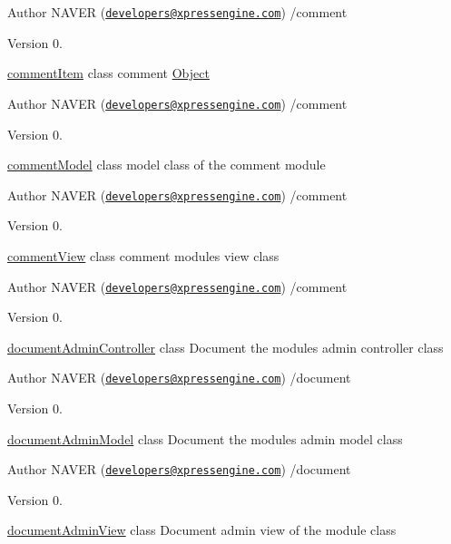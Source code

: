 \begin{DoxyAuthor}{Author}
N\+A\+V\+E\+R (\href{mailto:developers@xpressengine.com}{\tt developers@xpressengine.\+com}) /comment 
\end{DoxyAuthor}
\begin{DoxyVersion}{Version}
0.
\end{DoxyVersion}
\hyperlink{classcommentItem}{comment\+Item} class comment \hyperlink{classObject}{Object}

\begin{DoxyAuthor}{Author}
N\+A\+V\+E\+R (\href{mailto:developers@xpressengine.com}{\tt developers@xpressengine.\+com}) /comment 
\end{DoxyAuthor}
\begin{DoxyVersion}{Version}
0.
\end{DoxyVersion}
\hyperlink{classcommentModel}{comment\+Model} class model class of the comment module

\begin{DoxyAuthor}{Author}
N\+A\+V\+E\+R (\href{mailto:developers@xpressengine.com}{\tt developers@xpressengine.\+com}) /comment 
\end{DoxyAuthor}
\begin{DoxyVersion}{Version}
0.
\end{DoxyVersion}
\hyperlink{classcommentView}{comment\+View} class comment module\textquotesingle{}s view class

\begin{DoxyAuthor}{Author}
N\+A\+V\+E\+R (\href{mailto:developers@xpressengine.com}{\tt developers@xpressengine.\+com}) /comment 
\end{DoxyAuthor}
\begin{DoxyVersion}{Version}
0.
\end{DoxyVersion}
\hyperlink{classdocumentAdminController}{document\+Admin\+Controller} class Document the module\textquotesingle{}s admin controller class

\begin{DoxyAuthor}{Author}
N\+A\+V\+E\+R (\href{mailto:developers@xpressengine.com}{\tt developers@xpressengine.\+com}) /document 
\end{DoxyAuthor}
\begin{DoxyVersion}{Version}
0.
\end{DoxyVersion}
\hyperlink{classdocumentAdminModel}{document\+Admin\+Model} class Document the module\textquotesingle{}s admin model class

\begin{DoxyAuthor}{Author}
N\+A\+V\+E\+R (\href{mailto:developers@xpressengine.com}{\tt developers@xpressengine.\+com}) /document 
\end{DoxyAuthor}
\begin{DoxyVersion}{Version}
0.
\end{DoxyVersion}
\hyperlink{classdocumentAdminView}{document\+Admin\+View} class Document admin view of the module class

